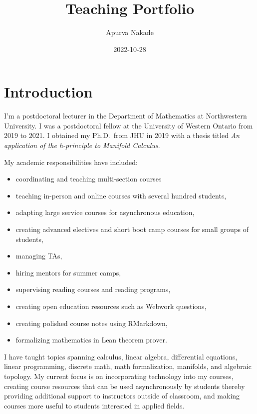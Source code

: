 \documentclass[
]{report}
\title{Teaching Portfolio}
\author{Apurva Nakade}
\date{2022-10-28}
\providecommand{\tightlist}{%
  \setlength{\itemsep}{0pt}\setlength{\parskip}{0pt}}
\begin{document}
\maketitle

\thispagestyle{empty}

{
\setcounter{tocdepth}{2}
\tableofcontents
}
\hypertarget{introduction}{%
\chapter*{Introduction}\label{introduction}}


I'm a postdoctoral lecturer in the Department of Mathematics at Northwestern
University. I was a postdoctoral fellow at the University of Western
Ontario from 2019 to 2021. I obtained my Ph.D.~from JHU in 2019 with a thesis titled \emph{An application of
the h-principle to Manifold Calculus}.

My academic responsibilities have included:

\begin{itemize}
\tightlist
\item
  coordinating and teaching multi-section courses
\item
  teaching in-person and online courses with several hundred students,
\item
  adapting large service courses for asynchronous education,
\item
  creating advanced electives and short boot camp courses for small groups of students,
\item
  managing TAs,
\item
  hiring mentors for summer camps,
\item
  supervising reading courses and reading programs,
\item
  creating open education resources such as Webwork questions,
\item
  creating polished course notes using RMarkdown,
\item
  formalizing mathematics in Lean theorem prover.
\end{itemize}

I have taught topics spanning calculus, linear algebra, differential equations, linear programming, discrete math, math formalization, manifolds, and algebraic topology.
My current focus is on incorporating technology into my courses, creating course resources that can be used asynchronously by students thereby providing additional support to instructors outside of classroom, and making courses more useful to students interested in applied fields.
\end{document}
